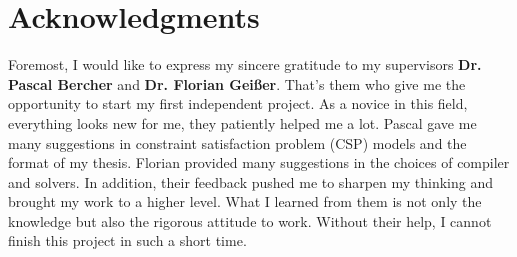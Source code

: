 \chapter*{Acknowledgments}
Foremost, I would like to express my sincere gratitude to my supervisors \textbf{Dr. Pascal Bercher} and \textbf{Dr. Florian Geißer}. That's them who give me the opportunity to start my first independent project. As a novice in this field, everything looks new for me, they patiently helped me a lot. Pascal gave me many suggestions in constraint satisfaction problem (CSP) models and the format of my thesis. Florian provided many suggestions in the choices of compiler and solvers. In addition, their feedback pushed me to sharpen my thinking and brought my work to a higher level. What I learned from them is not only the knowledge but also the rigorous attitude to work. Without their help, I cannot finish this project in such a short time.